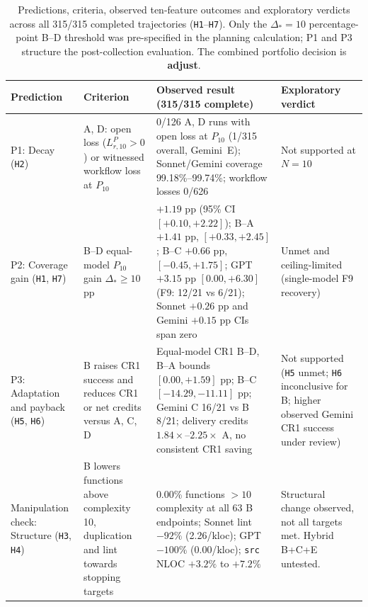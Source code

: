 \begin{table}[!htbp]
\centering\small
\caption{Predictions, criteria, observed ten-feature outcomes and exploratory
verdicts across all 315/315 completed trajectories (\texttt{H1}--\texttt{H7}).
Only the $\Delta_*=10$ percentage-point B--D threshold was pre-specified in
the planning calculation; P1 and P3 structure the post-collection evaluation.
The combined portfolio decision is \textbf{adjust}.}\label{tab:predictionverdicts}

\begin{tabularx}{\textwidth}{@{}L{0.22\textwidth}L{0.24\textwidth}YL{0.20\textwidth}@{}}
\toprule
Prediction & Criterion & Observed result (315/315 complete) & Exploratory verdict \\
\midrule
P1: Decay (\texttt{H2}) & A, D: open loss ($L^P_{r,10}>0$) or witnessed workflow loss at $P_{10}$ & 0/126 A, D runs with open loss at $P_{10}$ (1/315 overall, Gemini~E); Sonnet/Gemini coverage 99.18\%--99.74\%; workflow losses 0/626 & Not supported at $N=10$ \\
P2: Coverage gain (\texttt{H1}, \texttt{H7}) & B--D equal-model $P_{10}$ gain $\Delta_*\geq10$ pp & $+1.19$ pp (95\% CI $[+0.10,+2.22]$); B--A $+1.41$ pp, $[+0.33,+2.45]$; B--C $+0.66$ pp, $[-0.45,+1.75]$; GPT $+3.15$ pp $[0.00,+6.30]$ (F9: 12/21 vs 6/21); Sonnet $+0.26$ pp and Gemini $+0.15$ pp CIs span zero & Unmet and ceiling-limited (single-model F9 recovery) \\
P3: Adaptation and payback (\texttt{H5}, \texttt{H6}) & B raises CR1 success and reduces CR1 or net credits versus A, C, D & Equal-model CR1 B--D, B--A bounds $[0.00,+1.59]$ pp; B--C $[-14.29,-11.11]$ pp; Gemini C 16/21 vs B 8/21; delivery credits $1.84\times$--$2.25\times$ A, no consistent CR1 saving & Not supported (\texttt{H5} unmet; \texttt{H6} inconclusive for B; higher observed Gemini CR1 success under review) \\
Manipulation check: Structure (\texttt{H3}, \texttt{H4}) & B lowers functions above complexity 10, duplication and lint towards stopping targets & 0.00\% functions $>10$ complexity at all 63 B endpoints; Sonnet lint $-92\%$ (2.26/kloc); GPT $-100\%$ (0.00/kloc); \texttt{src} NLOC $+3.2\%$ to $+7.2\%$ & Structural change observed, not all targets met. Hybrid B+C+E untested. \\
\bottomrule
\end{tabularx}
\end{table}
